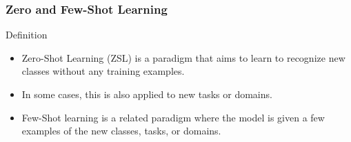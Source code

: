 \documentclass[
    11pt,
    notheorems,
    xcolor={dvipsnames},
    hyperref={
        pdfstartview=FitH, 
        pdftitle={Ikasketa-adibide urriko Informazio-Erauzketa}, 
        pdfauthor={Oscar Sainz Jimenez}, 
        citecolor=secondary, 
    }
]{beamer}
\begin{document}








\subsubsection{Zero and Few-Shot Learning}
\makesubsectiontitlepage

\begin{frame}

    \begin{block}{Definition}
        \begin{itemize}[<+->]
            \item Zero-Shot Learning (ZSL) is a paradigm that aims to learn to recognize new classes without any training examples.
            \item In some cases, this is also applied to new tasks or domains.
            \item Few-Shot learning is a related paradigm where the model is given a few examples of the new classes, tasks, or domains.
        \end{itemize}
    \end{block}

\end{frame}
\end{document}
